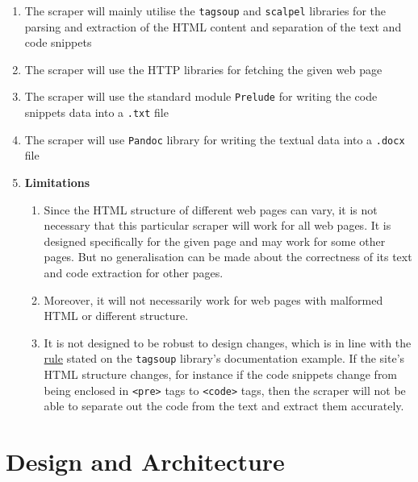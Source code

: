 \documentclass{scrreprt}
\begin{document}
\begin{enumerate}
    \item The scraper will mainly utilise the \texttt{tagsoup} and \texttt{scalpel} libraries for the parsing and extraction of the HTML content and separation of the text and code snippets
    \item The scraper will use the HTTP libraries for fetching the given web page
    \item The scraper will use the standard module \texttt{Prelude} for writing the code snippets data into a \texttt{.txt} file
    \item The scraper will use \texttt{Pandoc} library for writing the textual data into a \texttt{.docx} file
    \item \textbf{Limitations} %
    \begin{enumerate}
        \item Since the HTML structure of different web pages can vary, it is not necessary that this particular scraper will work for all web pages. It is designed specifically for the given page and may work for some other pages. But no generalisation can be made about the correctness of its text and code extraction for other pages.
        \item Moreover, it will not necessarily work for web pages with malformed HTML or different structure.
        \item It is not designed to be robust to design changes, which is in line with the \href{https://hackage.haskell.org/package/tagsoup-0.6/src/tagsoup.htm#:~:text=Rule%202%3A%0ADo%20not%20be%20robust%20to%20design%20changes%2C%20do%20not%20even%20consider%20the%20possibility%20when%20writing%20the%20code.}{rule} stated on the \texttt{tagsoup} library's documentation example. If the site's HTML structure changes, for instance if the code snippets change from being enclosed in \texttt{<pre>} tags to \texttt{<code>} tags, then the scraper will not be able to separate out the code from the text and extract them accurately.
    \end{enumerate}
\end{enumerate}






\chapter{Design and Architecture}
\end{document}
